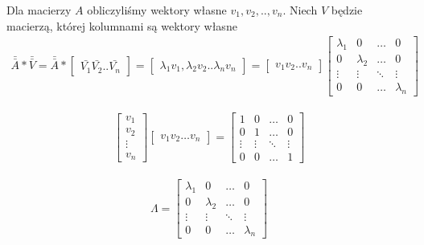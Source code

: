 Dla macierzy $A$ obliczyliśmy wektory własne $v_1, v_2, ..,v_n$. Niech $V$ będzie macierzą, której kolumnami są wektory własne
\begin{align*}
\bar{\bar{A}}*\bar{\bar{V}}=\bar{\bar{A}}*\begin{bmatrix}
\bar{V_1}\bar{V_2}..\bar{V_n}
\end{bmatrix} = \begin{bmatrix}
\lambda _1 v_1,\lambda _2 v_2..\lambda _n v_n
\end{bmatrix}=
\begin{bmatrix}
v_1v_2..v_n
\end{bmatrix}\begin{bmatrix}
\lambda _1 & 0 & \dots & 0\\
0 &\lambda _2 & \dots & 0\\
\vdots & \vdots & \ddots & \vdots \\
0 & 0 & \dots & \lambda _n
\end{bmatrix}
\end{align*}

\begin{align*}
\begin{bmatrix}
v_1\\v_2\\\vdots\\v_n
\end{bmatrix}\begin{bmatrix}
v_1v_2\dots v_n
\end{bmatrix}=\begin{bmatrix}
1 &0 &\dots & 0\\
0 & 1 & \dots &0\\
\vdots & \vdots & \ddots &\vdots \\
0 & 0 & \dots & 1
\end{bmatrix}
\end{align*}


\begin{align*}
\Lambda = \begin{bmatrix}
\lambda _1 & 0 & \dots & 0\\
0 & \lambda _2 & \dots & 0\\
\vdots & \vdots &\ddots & \vdots \\
0 & 0 & \dots & \lambda _n
\end{bmatrix}
\end{align*}

